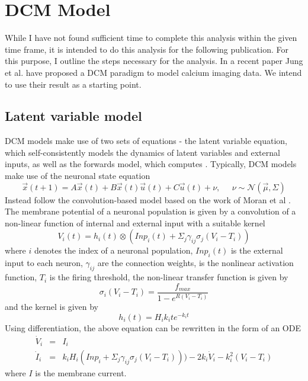 \documentclass[a4paper,10pt]{article}
\begin{document}
\section{DCM Model}
While I have not found sufficient time to complete this analysis within the given time frame, it is intended to do this analysis for the following publication. For this purpose, I outline the steps necessary for the analysis. In a recent paper \cite{jung_dynamic_2019} Jung et al. have proposed a DCM paradigm to model calcium imaging data. We intend to use their result as a starting point.

\subsection{Latent variable model}
DCM models make use of two sets of equations - the latent variable equation, which self-consistently models the dynamics of latent variables and external inputs, as well as the forwards model, which computes . Typically, DCM models make use of the neuronal state equation \cite{stephan_dynamic_2007}
\begin{equation}
   \vec{x}(t+1) = A\vec{x}(t) + B \vec{x}(t) \vec{u}(t) + C\vec{u}(t) + \nu, \;\;\;\;\; \nu \sim \mathcal{N}(\vec{\mu}, \Sigma)
\end{equation}
Instead \cite{jung_dynamic_2019} follow the convolution-based model based on the work of Moran et al \cite{moran_neural_2013} . The membrane potential of a neuronal population is given by a convolution of a non-linear function of internal and external input with a suitable kernel
\begin{equation}
   V_i(t) = h_{i}(t) \otimes (Inp_i(t) + \Sigma_j \gamma_{ij} \sigma_j(V_i - T_i))
\end{equation}
where $i$ denotes the index of a neuronal population, $Inp_i(t)$ is the external input to each neuron, $\gamma_{ij}$ are the connection weights,  is the nonlinear activation function, $T_i$ is the firing threshold, the non-linear transfer function is given by
\begin{equation}
   \sigma_i(V_i - T_i) = \frac{f_{max}}{1 - e^{R(V_i - T_i)}}
\end{equation}
and the kernel is given by
\begin{equation}
   h_i(t) = H_i k_i t e^{-k_i t}
\end{equation}
Using differentiation, the above equation can be rewritten in the form of an ODE
\begin{eqnarray}
\dot{V}_i &=& I_i \\
\dot{I}_i &=& k_i H_i (Inp_i + \Sigma_j \gamma_{ij} \sigma_j(V_i - T_i))) - 2k_i \dot{V}_i - k_i^2 (V_i - T_i)
\end{eqnarray}
where $I$ is the membrane current.
\end{document}
